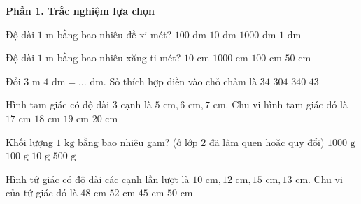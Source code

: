 \textbf{Phần 1. Trắc nghiệm lựa chọn}

\begin{ex} %
Độ dài $1\text{ m}$ bằng bao nhiêu đề-xi-mét?
\choice
{$100\text{ dm}$}
{\True $10\text{ dm}$}
{$1000\text{ dm}$}
{$1\text{ dm}$}
\end{ex}

\begin{ex} %
Độ dài $1\text{ m}$ bằng bao nhiêu xăng-ti-mét?
\choice
{$10\text{ cm}$}
{$1000\text{ cm}$}
{\True $100\text{ cm}$}
{$50\text{ cm}$}
\end{ex}

\begin{ex} %
Đổi $3\text{ m } 4\text{ dm} = \dots\text{ dm}$. Số thích hợp điền vào chỗ chấm là
\choice
{\True $34$}
{$304$}
{$340$}
{$43$}
\end{ex}

\begin{ex} %
Hình tam giác có độ dài 3 cạnh là $5\text{ cm}, 6\text{ cm}, 7\text{ cm}$. Chu vi hình tam giác đó là
\choice
{$17\text{ cm}$}
{\True $18\text{ cm}$}
{$19\text{ cm}$}
{$20\text{ cm}$}
\end{ex}

\begin{ex} %
Khối lượng $1\text{ kg}$ bằng bao nhiêu gam? (ở lớp 2 đã làm quen hoặc quy đổi)
\choice
{\True $1000\text{ g}$}
{$100\text{ g}$}
{$10\text{ g}$}
{$500\text{ g}$}
\end{ex}

\begin{ex} %
Hình tứ giác có độ dài các cạnh lần lượt là $10\text{ cm}, 12\text{ cm}, 15\text{ cm}, 13\text{ cm}$. Chu vi của tứ giác đó là
\choice
{$48\text{ cm}$}
{$52\text{ cm}$}
{$45\text{ cm}$}
{\True $50\text{ cm}$}
\end{ex}

